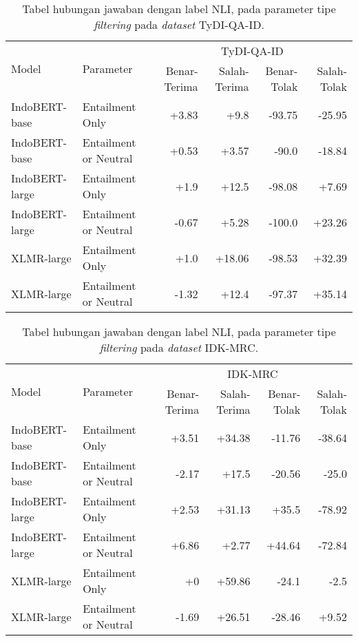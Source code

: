 \begin{table}[H]\centering
\footnotesize
\begin{tabular}{llrrrr}
\toprule
         \multirow{2}{*}{Model} &\multirow{2}{*}{Parameter} &\multicolumn{4}{c}{TyDI-QA-ID} \\\cmidrule{3-6}
& &Benar-Terima &Salah-Terima &Benar-Tolak &Salah-Tolak \\\midrule
 IndoBERT-base &       Entailment Only &        +3.83 &         +9.8 &      -93.75 &      -25.95 \\
 IndoBERT-base & Entailment or Neutral &        +0.53 &        +3.57 &       -90.0 &      -18.84 \\
\hline
IndoBERT-large &       Entailment Only &         +1.9 &        +12.5 &      -98.08 &       +7.69 \\
IndoBERT-large & Entailment or Neutral &        -0.67 &        +5.28 &      -100.0 &      +23.26 \\
\hline
    XLMR-large &       Entailment Only &         +1.0 &       +18.06 &      -98.53 &      +32.39 \\
    XLMR-large & Entailment or Neutral &        -1.32 &        +12.4 &      -97.37 &      +35.14 \\
\bottomrule
\end{tabular}
\caption{Tabel hubungan jawaban dengan label NLI, pada parameter tipe \emph{filtering} pada \emph{dataset} TyDI-QA-ID.}
\end{table}

\begin{table}[H]\centering
\footnotesize
\begin{tabular}{llrrrr}
\toprule
         \multirow{2}{*}{Model} &\multirow{2}{*}{Parameter} &\multicolumn{4}{c}{IDK-MRC} \\\cmidrule{3-6}
& &Benar-Terima &Salah-Terima &Benar-Tolak &Salah-Tolak \\\midrule
 IndoBERT-base &       Entailment Only &        +3.51 &       +34.38 &      -11.76 &      -38.64 \\
 IndoBERT-base & Entailment or Neutral &        -2.17 &        +17.5 &      -20.56 &       -25.0 \\
\hline
IndoBERT-large &       Entailment Only &        +2.53 &       +31.13 &       +35.5 &      -78.92 \\
IndoBERT-large & Entailment or Neutral &        +6.86 &        +2.77 &      +44.64 &      -72.84 \\
\hline
    XLMR-large &       Entailment Only &           +0 &       +59.86 &       -24.1 &        -2.5 \\
    XLMR-large & Entailment or Neutral &        -1.69 &       +26.51 &      -28.46 &       +9.52 \\
\bottomrule
\end{tabular}
\caption{Tabel hubungan jawaban dengan label NLI, pada parameter tipe \emph{filtering} pada \emph{dataset} IDK-MRC.}
\end{table}

